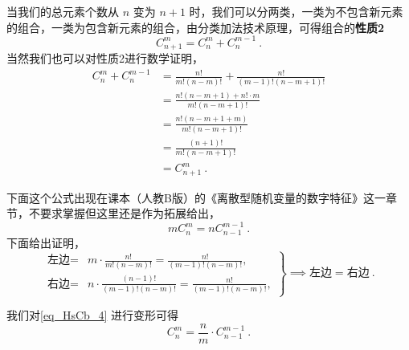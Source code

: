 当我们的总元素个数从 $n$ 变为 $n+1$ 时，我们可以分两类，一类为不包含新元素的组合，一类为包含新元素的组合，由分类加法技术原理，可得组合的\textbf{性质2}
\begin{equation}\label{eq_HsCb_5}
C_{n + 1}^m = C_n^m + C_n^{m -1}~.
\end{equation}
当然我们也可以对性质2进行数学证明，
\begin{equation}
\begin{aligned}
C_n^m + C_n^{m - 1} 
&= \frac{n!}{m!(n-m)!} + \frac{n!}{(m - 1)!(n - m + 1)!}\\
&= \frac{n!(n - m + 1) + n!\cdot m}{m!(n - m + 1)!}\\
&= \frac{n!(n - m + 1 + m) }{m!(n - m + 1)!}\\
&= \frac{(n + 1)!}{m!(n - m + 1)!}\\
&= C_{n + 1}^m~.
\end{aligned}
\end{equation}

下面这个公式出现在课本（人教B版）的《离散型随机变量的数字特征》这一章节，不要求掌握但这里还是作为拓展给出，
\begin{equation}\label{eq_HsCb_4}
mC_n^m = nC_{n-1}^{m-1}~.
\end{equation}
下面给出证明，
\begin{equation}
\left. 
\begin{aligned}
\text{左边} ={}& m\cdot \frac{n!}{m!(n-m)!} = \frac{n!}{(m-1)!(n-m)!}, \\
\text{右边} ={}& n\cdot \frac{(n-1)!}{(m-1)!(n-m)!} = \frac{n!}{(m-1)!(n-m)!}, 
\end{aligned}
\right\}
\implies \text{左边} = \text{右边}~.
\end{equation}

我们对\autoref{eq_HsCb_4} 进行变形可得
\begin{equation}
C_n^m = \frac{n}{m} \cdot C_{n-1}^{m-1}~.
\end{equation}








